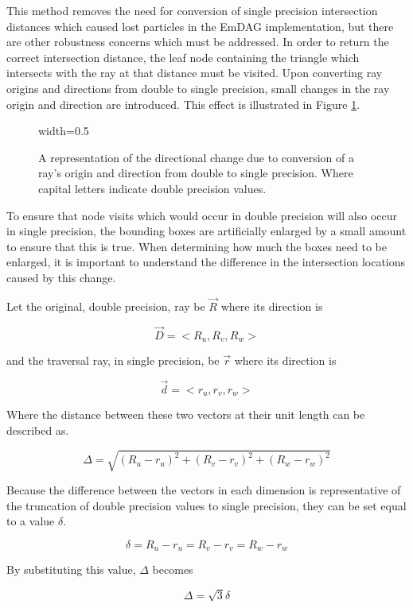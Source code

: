 This method removes the need for conversion of single precision intersection
distances which caused lost particles in the EmDAG implementation, but there are
other robustness concerns which must be addressed. In order to return the
correct intersection distance, the leaf node containing the triangle which
intersects with the ray at that distance must be visited. Upon converting ray
origins and directions from double to single precision, small changes in the ray
origin and direction are introduced. This effect is illustrated in Figure
\ref{fig:double_to_single_ray}.

\begin{figure}[H]
  \centering
  {width=0.5\textwidth}
  \caption{A representation of the directional change due to conversion of a
    ray's origin and direction from double to single precision. Where capital
    letters indicate double precision values.}
  \label{fig:double_to_single_ray}
\end{figure}

To ensure that node visits which would occur in double precision will also occur
in single precision, the bounding boxes are artificially enlarged by a small
amount to ensure that this is true. When determining how much the boxes need to
be enlarged, it is important to understand the difference in the intersection
locations caused by this change.

Let the original, double precision, ray be $\vec{R}$ where its direction is

$$ \vec{D} = < R_{u}, R_{v}, R_{w} > $$

and the traversal ray, in single precision, be $\vec{r}$ where its direction is

$$ \vec{d} = < r_{u}, r_{v}, r_{w} > $$

Where the distance between these two vectors at their unit length
can be described as.

$$ \Delta = \sqrt{ (R_{u} - r_{u})^{2} + (R_{v} - r_{v})^{2} + (R_{w} -
  r_{w})^{2} } $$

Because the difference between the vectors in each dimension is representative
of the truncation of double precision values to single precision, they can be
set equal to a value $\delta$.

$$ \delta = R_{u} - r_{u} = R_{v} - r_{v} = R_{w} -  r_{w} $$

By substituting this value, $\Delta$ becomes

$$ \Delta = \sqrt{3} \delta $$

